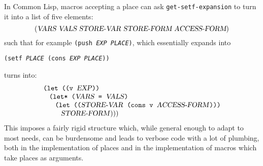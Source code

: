 \documentclass[format=acmsmall, review]{acmart}
\makeatletter
\newcommand \MAlign [1] {\begin{array}{@{}l@{}}#1\end{array}}
\makeatother
\begin{document}
In Common Lisp, macros accepting a place can ask \texttt{get-setf-expansion}
to turn it into a list of five elements:
\begin{displaymath}
  (\textsl{VARS}~\textsl{VALS}~\textsl{STORE-VAR}~\textsl{STORE-FORM}
  ~\textsl{ACCESS-FORM})
\end{displaymath}
such that for example \texttt{(push \textrm{\textsl{EXP}} \textrm{\textsl{PLACE}})},
which essentially expands into
%
\begin{center}
\texttt{(setf \textrm{\textsl{PLACE}} (cons \textrm{\textsl{EXP}} \textrm{\textsl{PLACE}}))}
\end{center}
%
turns into:
\begin{displaymath}
  \MAlign{
    \texttt{(let ((v \textrm{\textsl{EXP}}))} \\
    \;\;\;\MAlign{
      \texttt{(let* (\textrm{\textsl{VARS}} = \textrm{\textsl{VALS}})} \\
      \;\;\;\MAlign{
        \texttt{(let ((\textrm{\textsl{STORE-VAR}} (cons v \textrm{\textsl{ACCESS-FORM}})))} \\
        \;\;\;\textrm{\textsl{STORE-FORM})))}}}}
\end{displaymath}
This imposes a fairly rigid structure which, while general enough to adapt
to most needs, can be burdensome and leads to verbose code with a lot
of plumbing, both in the implementation of places and in the implementation
of macros which take places as arguments.
\end{document}
